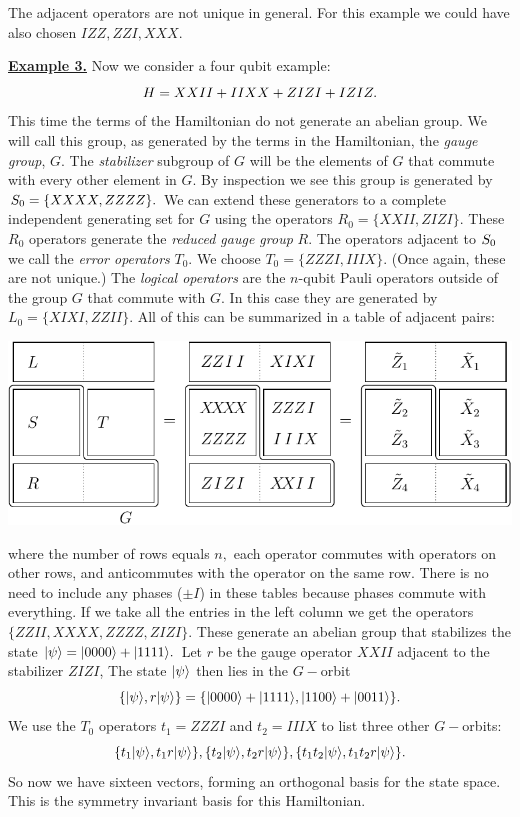 The adjacent operators are not unique in general. 
For this example we could have also chosen $IZZ, ZZI, XXX.$

\underline{\bf Example 3.}
Now we consider a four qubit example:
$$
    H = XXII + IIXX + ZIZI + IZIZ.
$$
This time the terms of the Hamiltonian do not generate 
an abelian group.
We will call this group, as generated by the terms in the Hamiltonian,
the \emph{gauge group}, $G$.
The \emph{stabilizer} subgroup of $G$ will be the elements of $G$
that commute with every other element in $G.$
By inspection we see this group is generated by $S_0=\{XXXX, ZZZZ\}.$
We can extend these generators to a complete independent generating
set for $G$ using the operators  $R_0=\{XXII, ZIZI\}.$
These $R_0$ operators generate the \emph{reduced gauge group} $R.$
The operators adjacent to $S_0$ we
call the \emph{error operators} $T_0$. 
We choose $T_0 = \{ZZZI, IIIX\}.$
(Once again, these are not unique.)
The \emph{logical operators} are the $n$-qubit 
Pauli operators outside of the group
$G$ that commute with $G.$
In this case they are generated by $L_0 = \{XIXI, ZZII\}.$
All of this can be summarized in a table of adjacent pairs:
\begin{center}
\includegraphics[]{pic-gauge4.pdf}
\end{center}
where the number of rows equals $n,$ 
each operator commutes with operators on other rows,
and anticommutes with the operator on the same row. 
There is no need to include any phases ($\pm I$) in these tables
because phases commute with everything.
If we take all the entries in the left column
we get the operators 
$\{ ZZII, XXXX, ZZZZ, ZIZI \}.$ 
These generate an abelian group 
that stabilizes the
state $|{\psi}\rangle = |{0000}\rangle+|{1111}\rangle.$
Let $r$ be the gauge operator $XXII$ adjacent to the 
stabilizer $ZIZI$,
The state $|{\psi}\rangle$ then lies in the $G-$orbit 
$$
\{|{\psi}\rangle, r|{\psi}\rangle\} = \{|{0000}\rangle+|{1111}\rangle, |{1100}\rangle+|{0011}\rangle\}.
$$
We use the $T_0$ operators $t_1=ZZZI$ and $t_2=IIIX$
to list three other $G-$orbits:
$$
\{t_1 |{\psi}\rangle, t_1 r|{\psi}\rangle\}, 
\{t_2 |{\psi}\rangle, t_2 r|{\psi}\rangle\}, 
\{t_1 t_2 |{\psi}\rangle, t_1 t_2 r|{\psi}\rangle\}.
$$
So now we have sixteen vectors, forming an orthogonal basis for the state space.
This is the symmetry invariant basis for this Hamiltonian.

